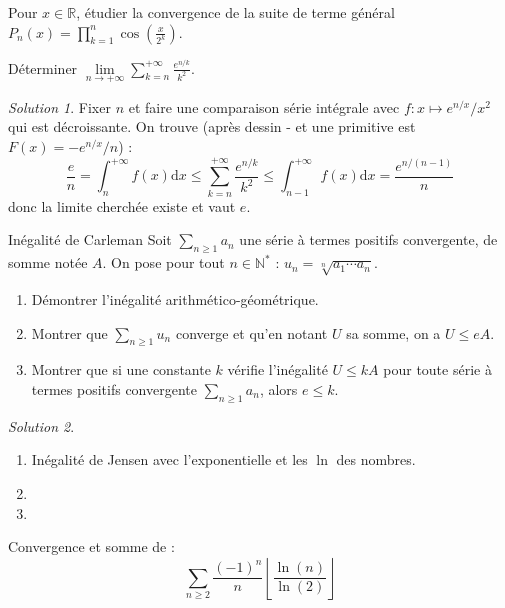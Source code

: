 \documentclass[french]{book}
\newcommand{\N}{\mathbb{N}}
\newcommand{\R}{\mathbb{R}}
\newcommand{\st}{^*}
\theoremstyle{definition}
\theoremstyle{remark}
\newtheorem*{sol}{Solution}
\begin{document}
\begin{exo}[0]{}
	Pour $x\in\R$, étudier la convergence de la suite de terme général $P_n(x)=\displaystyle\prod_{k=1}^{n}\cos\left(\frac{x}{2^k}\right)$.
\end{exo}

\begin{exo}[1]{}
	Déterminer $\displaystyle\underset{n\to+\infty}{\lim}\sum_{k=n}^{+\infty}\frac{e^{n/k}}{k^2}$.
\end{exo}
\begin{sol}
	Fixer $n$ et faire une comparaison série intégrale avec $f:x\mapsto e^{n/x}/x^2$ qui est décroissante. On trouve (après dessin - et une primitive est $F(x)=-e^{n/x}/n$) :
	$$\frac{e}{n}=\int_{n}^{+\infty}f(x)\text{d} x\leqslant\sum_{k=n}^{+\infty}\frac{e^{n/k}}{k^2}\leqslant\int_{n-1}^{+\infty}f(x)\text{d} x=\frac{e^{n/(n-1)}}{n}$$ donc la limite cherchée existe et vaut $e$.
\end{sol}

\begin{exo}[2]{Inégalité de Carleman}
	Soit $\displaystyle\sum_{n\geqslant 1}a_n$ une série à termes positifs convergente, de somme notée $A$. On pose pour tout $n\in\N\st$ : $u_n=\sqrt[n]{a_1\cdots a_n}$.
	\begin{enumerate}
		\item Démontrer l'inégalité arithmético-géométrique.
		\item Montrer que $\displaystyle\sum_{n\geqslant 1}u_n$ converge et qu'en notant $U$ sa somme, on a $U\leqslant e A$.
		\item Montrer que si une constante $k$ vérifie l'inégalité $U\leqslant k A$ pour toute série à termes positifs convergente $\displaystyle\sum_{n\geqslant 1}a_n$, alors $e\leqslant k$.
	\end{enumerate}
\end{exo}
\begin{sol}
	\begin{enumerate}
		\item Inégalité de Jensen avec l'exponentielle et les $\ln$ des nombres.
		\item 
		\item 
	\end{enumerate}
\end{sol}

\begin{exo}[2]{}
	Convergence et somme de : $$\sum_{n\geqslant 2}\frac{(-1)^n}{n}\left\lfloor\frac{\ln(n)}{\ln(2)}\right\rfloor$$
\end{exo}
\end{document}
